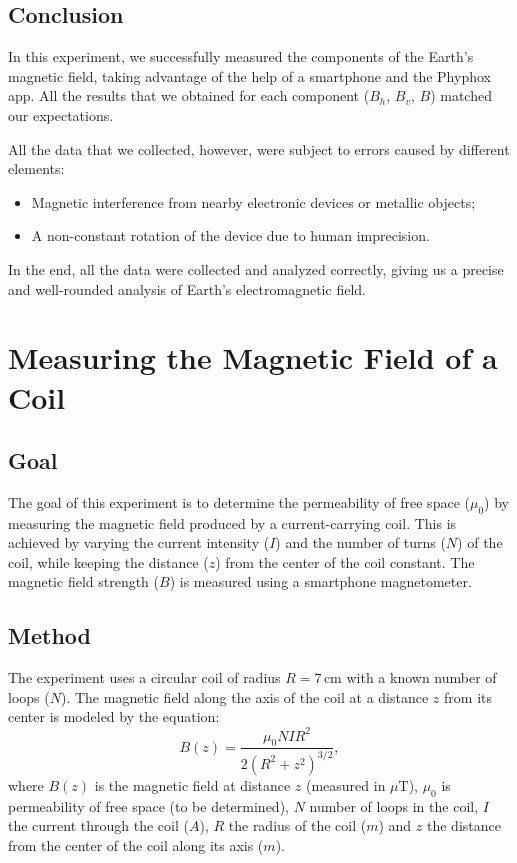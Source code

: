 \documentclass[notitlepage]{report}
\numberwithin{equation}{section}
\theoremstyle{plain}
\theoremstyle{definition}
\theoremstyle{remark}
\begin{document}
\section{Conclusion}
In this experiment, we successfully measured the components of the Earth’s magnetic field, taking advantage of the help of a smartphone and the Phyphox app. All the results that we obtained for each component ($B_h$, $B_v$, $B$) matched our expectations.

All the data that we collected, however, were subject to errors caused by different elements:
\begin{itemize}
    \item Magnetic interference from nearby electronic devices or metallic objects;
    \item A non-constant rotation of the device due to human imprecision.
\end{itemize}

In the end, all the data were collected and analyzed correctly, giving us a precise and well-rounded analysis of Earth’s electromagnetic field.

\chapter{Measuring the Magnetic Field of a Coil}

\section{Goal}
The goal of this experiment is to determine the permeability of free space
(\(\mu_0\)) by measuring the magnetic field produced by a current-carrying coil.
This is achieved by varying the current intensity (\(I\)) and the number of
turns (\(N\)) of the coil, while keeping the distance (\(z\)) from the center of
the coil constant. The magnetic field strength (\(B\)) is measured using a
smartphone magnetometer.

\section{Method}
The experiment uses a circular coil of radius \(R = 7 \, \text{cm}\) with a
known number of loops (\(N\)). The magnetic field along the axis of the coil at
a distance \(z\) from its center is modeled by the equation:
\[
B(z) = \frac{\mu_0 N I R^2}{2 {\left(R^2 + z^2\right)}^{3/2}},
\]
where \(B(z)\) is the magnetic field at distance \(z\) (measured in
\(\mu\text{T}\)), \(\mu_0\) is permeability of free space (to be determined),
\(N\) number of loops in the coil, \(I\) the current through the coil (\(A\)),
\(R\) the radius of the coil  (\(m\)) and \(z\) the distance from the center of
the coil along its axis (\(m\)).
\end{document}
